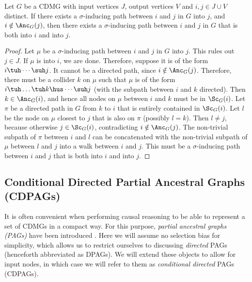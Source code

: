 \begin{Lem}\label{lem:sigma-inducing_path_into_into}
  Let $G$ be a CDMG with input vertices $J$, output vertices $V$ and $i, j \in J \cup V$ distinct.
  If there exists a $\sigma$-inducing path between $i$ and $j$ in $G$ into $j$, and $i \notin \Anc_G(j)$, then there exists a $\sigma$-inducing path between $i$ and $j$ in $G$ that is both into $i$ and into $j$.
\end{Lem}
\begin{proof}
  Let $\mu$ be a $\sigma$-inducing path between $i$ and $j$ in $G$ into $j$.
  This rules out $j \in J$.
  If $\mu$ is into $i$, we are done.
  Therefore, suppose it is of the form $i \tuh \cdots \suh j$. 
  It cannot be a directed path, since $i \notin \Anc_G(j)$.
  Therefore, there must be a collider $k$ on $\mu$ such that $\mu$ is of the form $i \tuh \dots \tuh k \hus \cdots \suh j$
  (with the subpath between $i$ and $k$ directed).
  Then $k \in \Anc_G(i)$, and hence all nodes on $\mu$ between $i$ and $k$ must be in $\Sc_G(i)$.
  Let $\pi$ be a directed path in $G$ from $k$ to $i$ that is entirely contained in $\Sc_G(i)$.
  Let $l$ be the node on $\mu$ closest to $j$ that is also on $\pi$ (possibly $l = k$).
  Then $l \ne j$, because otherwise $j \in \Sc_G(i)$, contradicting $i \notin \Anc_G(j)$.
  The non-trivial subpath of $\pi$ between $i$ and $l$ can be concatenated with the non-trivial subpath of $\mu$ between $l$ and $j$ into a walk between $i$ and $j$.
  This must be a $\sigma$-inducing path between $i$ and $j$ that is both into $i$ and into $j$.
\end{proof}

\subsection{Conditional Directed Partial Ancestral Graphs (CDPAGs)}

It is often convenient when performing causal reasoning to be able to represent a set of CDMGs in a compact way. 
For this purpose, \emph{partial ancestral graphs (PAGs)} have been introduced \cite{SMR1999,Zhang2006}.
Here we will assume no selection bias for simplicity, which allows us to restrict ourselves to discussing 
\emph{directed} PAGs (henceforth abbreviated as DPAGs).
We will extend these objects to allow for input nodes, in which case we will refer to them as \emph{conditional directed} PAGs (CDPAGs).

